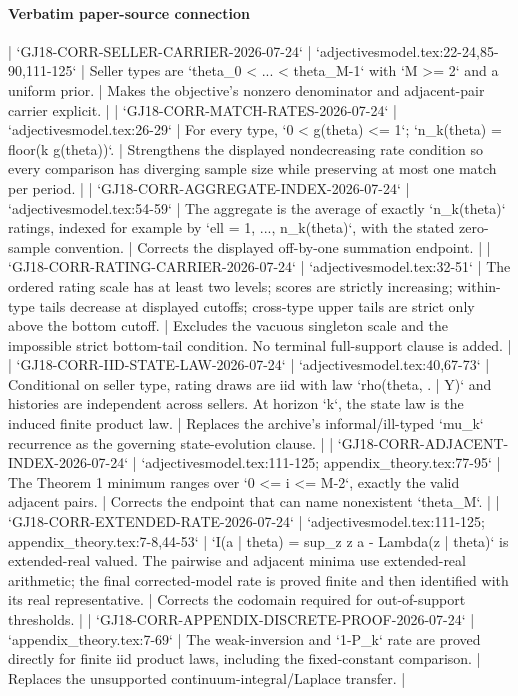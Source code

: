 \documentclass[10pt]{article}
\begin{document}
\paragraph{Verbatim paper-source connection}
\begin{ReviewVerbatim}
| `GJ18-CORR-SELLER-CARRIER-2026-07-24` | `adjectivesmodel.tex:22-24,85-90,111-125` | Seller types are `theta_0 < ... < theta_{M-1}` with `M >= 2` and a uniform prior. | Makes the objective's nonzero denominator and adjacent-pair carrier explicit. |
| `GJ18-CORR-MATCH-RATES-2026-07-24` | `adjectivesmodel.tex:26-29` | For every type, `0 < g(theta) <= 1`; `n_k(theta) = floor(k g(theta))`. | Strengthens the displayed nondecreasing rate condition so every comparison has diverging sample size while preserving at most one match per period. |
| `GJ18-CORR-AGGREGATE-INDEX-2026-07-24` | `adjectivesmodel.tex:54-59` | The aggregate is the average of exactly `n_k(theta)` ratings, indexed for example by `ell = 1, ..., n_k(theta)`, with the stated zero-sample convention. | Corrects the displayed off-by-one summation endpoint. |
| `GJ18-CORR-RATING-CARRIER-2026-07-24` | `adjectivesmodel.tex:32-51` | The ordered rating scale has at least two levels; scores are strictly increasing; within-type tails decrease at displayed cutoffs; cross-type upper tails are strict only above the bottom cutoff. | Excludes the vacuous singleton scale and the impossible strict bottom-tail condition. No terminal full-support clause is added. |
| `GJ18-CORR-IID-STATE-LAW-2026-07-24` | `adjectivesmodel.tex:40,67-73` | Conditional on seller type, rating draws are iid with law `rho(theta, . | Y)` and histories are independent across sellers. At horizon `k`, the state law is the induced finite product law. | Replaces the archive's informal/ill-typed `mu_k` recurrence as the governing state-evolution clause. |
| `GJ18-CORR-ADJACENT-INDEX-2026-07-24` | `adjectivesmodel.tex:111-125; appendix_theory.tex:77-95` | The Theorem 1 minimum ranges over `0 <= i <= M-2`, exactly the valid adjacent pairs. | Corrects the endpoint that can name nonexistent `theta_M`. |
| `GJ18-CORR-EXTENDED-RATE-2026-07-24` | `adjectivesmodel.tex:111-125; appendix_theory.tex:7-8,44-53` | `I(a | theta) = sup_z {z a - Lambda(z | theta)}` is extended-real valued. The pairwise and adjacent minima use extended-real arithmetic; the final corrected-model rate is proved finite and then identified with its real representative. | Corrects the codomain required for out-of-support thresholds. |
| `GJ18-CORR-APPENDIX-DISCRETE-PROOF-2026-07-24` | `appendix_theory.tex:7-69` | The weak-inversion and `1-P_k` rate are proved directly for finite iid product laws, including the fixed-constant comparison. | Replaces the unsupported continuum-integral/Laplace transfer. |


\end{ReviewVerbatim}
\end{document}
